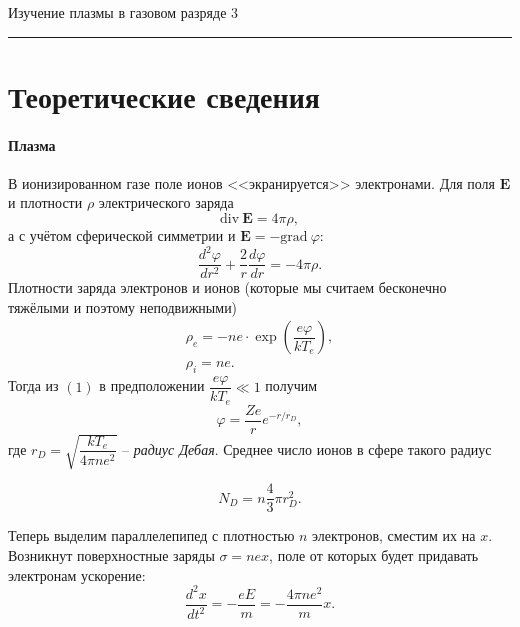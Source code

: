 \documentclass[12pt,a4paper]{scrartcl}
\begin{document}
	\newpage


	\begin{flushleft}
		\footnotesize{Изучение плазмы в газовом разряде} \hspace{\fill} \footnotesize{3}
		\\[-0.3cm]\noindent\rule{\textwidth}{0.3pt}
	\end{flushleft}	

	\section{Теоретические сведения}

	\paragraph{Плазма} \hfill
	
	В ионизированном газе поле ионов <<экранируется>> электронами. Для поля $\mathbf{E}$ и плотности $\rho$ электрического заряда
$$
\text{div}~\mathbf{E} = 4 \pi \rho,
$$
а с учётом сферической симметрии и $\mathbf{E} = -\text{grad}~\varphi$:
\begin{equation}
\dfrac{d^2 \varphi}{dr^2}+\dfrac{2}{r}\dfrac{d\varphi}{dr}=-4\pi \rho.
\end{equation}
Плотности заряда электронов и ионов (которые мы считаем бесконечно тяжёлыми и поэтому неподвижными)
\begin{equation}
\begin{array}{c}
\rho_e = -ne \cdot \exp\left(\dfrac{e\varphi}{kT_e}\right),\\
\rho_i = ne.
\end{array}
\end{equation}
Тогда из $(1)$ в предположении $\dfrac{e\varphi}{kT_e} \ll 1$ получим
\begin{equation}
\varphi = \dfrac{Ze}{r}e^{-r/r_D},
\end{equation}
где $r_D = \sqrt{\dfrac{kT_e}{4\pi n e^2}}$ -- \textit{радиус Дебая}. Среднее число ионов в сфере такого радиус

\begin{equation}
N_D = n\dfrac{4}{3}\pi r_D^2.
\end{equation}

Теперь выделим параллелепипед с плотностью $n$ электронов, сместим их на $x$. Возникнут поверхностные заряды $\sigma = nex$, поле от которых будет придавать электронам ускорение:
$$
\dfrac{d^2x}{dt^2}=-\dfrac{eE}{m}=-\dfrac{4\pi n e^2}{m}x.
$$ 
\end{document}
